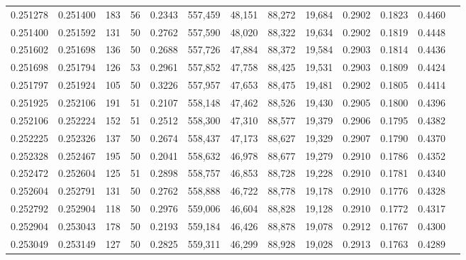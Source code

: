 \begin{tabular}{rrrrrrrrrrrrr}
0.251278 & 0.251400 &   183 &  56 &                                     0.2343 & 557,459 &  48,151 &  88,272 &  19,684 & 0.2902 & 0.1823 & 0.4460 \\
0.251400 & 0.251592 &   131 &  50 &                                     0.2762 & 557,590 &  48,020 &  88,322 &  19,634 & 0.2902 & 0.1819 & 0.4448 \\
0.251602 & 0.251698 &   136 &  50 &                                     0.2688 & 557,726 &  47,884 &  88,372 &  19,584 & 0.2903 & 0.1814 & 0.4436 \\
0.251698 & 0.251794 &   126 &  53 &                                     0.2961 & 557,852 &  47,758 &  88,425 &  19,531 & 0.2903 & 0.1809 & 0.4424 \\
0.251797 & 0.251924 &   105 &  50 &                                     0.3226 & 557,957 &  47,653 &  88,475 &  19,481 & 0.2902 & 0.1805 & 0.4414 \\
0.251925 & 0.252106 &   191 &  51 &                                     0.2107 & 558,148 &  47,462 &  88,526 &  19,430 & 0.2905 & 0.1800 & 0.4396 \\
0.252106 & 0.252224 &   152 &  51 &                                     0.2512 & 558,300 &  47,310 &  88,577 &  19,379 & 0.2906 & 0.1795 & 0.4382 \\
0.252225 & 0.252326 &   137 &  50 &                                     0.2674 & 558,437 &  47,173 &  88,627 &  19,329 & 0.2907 & 0.1790 & 0.4370 \\
0.252328 & 0.252467 &   195 &  50 &                                     0.2041 & 558,632 &  46,978 &  88,677 &  19,279 & 0.2910 & 0.1786 & 0.4352 \\
0.252472 & 0.252604 &   125 &  51 &                                     0.2898 & 558,757 &  46,853 &  88,728 &  19,228 & 0.2910 & 0.1781 & 0.4340 \\
0.252604 & 0.252791 &   131 &  50 &                                     0.2762 & 558,888 &  46,722 &  88,778 &  19,178 & 0.2910 & 0.1776 & 0.4328 \\
0.252792 & 0.252904 &   118 &  50 &                                     0.2976 & 559,006 &  46,604 &  88,828 &  19,128 & 0.2910 & 0.1772 & 0.4317 \\
0.252904 & 0.253043 &   178 &  50 &                                     0.2193 & 559,184 &  46,426 &  88,878 &  19,078 & 0.2912 & 0.1767 & 0.4300 \\
0.253049 & 0.253149 &   127 &  50 &                                     0.2825 & 559,311 &  46,299 &  88,928 &  19,028 & 0.2913 & 0.1763 & 0.4289 \\

\end{tabular}
